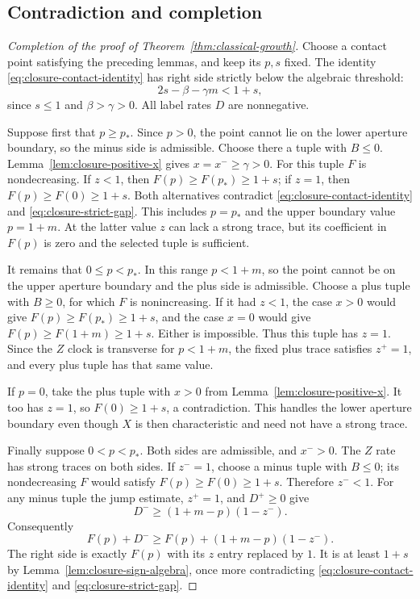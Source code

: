 \subsection{Contradiction and completion}

\begin{proof}[Completion of the proof of Theorem~\ref{thm:classical-growth}]
Choose a contact point satisfying the preceding lemmas, and keep its
$p,s$ fixed.  The identity \eqref{eq:closure-contact-identity} has
right side strictly below the algebraic threshold:
\begin{equation}
 2s-\beta-\gamma m<1+s,
 \label{eq:closure-strict-gap}
\end{equation}
since $s\le1$ and $\beta>\gamma>0$.  All label rates $D$ are
nonnegative.

Suppose first that $p\ge p_*$.  Since $p>0$, the point cannot lie
on the lower aperture boundary, so the minus side is admissible.
Choose there a tuple with $B\le0$.  Lemma~\ref{lem:closure-positive-x}
gives $x=x^-\ge\gamma>0$.  For this tuple $F$ is nondecreasing.
If $z<1$, then $F(p)\ge F(p_*)\ge1+s$; if $z=1$, then
$F(p)\ge F(0)\ge1+s$.  Both alternatives contradict
\eqref{eq:closure-contact-identity} and \eqref{eq:closure-strict-gap}.
This includes $p=p_*$ and the upper boundary value $p=1+m$.
At the latter value $z$ can lack a strong trace, but its coefficient
in $F(p)$ is zero and the selected tuple is sufficient.

It remains that $0\le p<p_*$.  In this range $p<1+m$, so the
point cannot be on the upper aperture boundary and the plus side is
admissible.  Choose a plus tuple with $B\ge0$, for which $F$ is
nonincreasing.  If it had $z<1$, the case $x>0$ would give
$F(p)\ge F(p_*)\ge1+s$, and the case $x=0$ would give
$F(p)\ge F(1+m)\ge1+s$.  Either is impossible.  Thus this tuple
has $z=1$.  Since the $Z$ clock is transverse for $p<1+m$, the
fixed plus trace satisfies $z^+=1$, and every plus tuple has that
same value.

If $p=0$, take the plus tuple with $x>0$ from
Lemma~\ref{lem:closure-positive-x}.  It too has $z=1$, so
$F(0)\ge1+s$, a contradiction.  This handles the lower aperture
boundary even though $X$ is then characteristic and need not have a
strong trace.

Finally suppose $0<p<p_*$.  Both sides are admissible, and
$x^->0$.  The $Z$ rate has strong traces on both sides.  If
$z^-=1$, choose a minus tuple with $B\le0$; its nondecreasing $F$
would satisfy $F(p)\ge F(0)\ge1+s$.  Therefore $z^-<1$.
For any minus tuple the jump estimate, $z^+=1$, and $D^+\ge0$ give
\[
 D^-\ge(1+m-p)(1-z^-).
\]
Consequently
\[
 F(p)+D^-\ge F(p)+(1+m-p)(1-z^-).
\]
The right side is exactly $F(p)$ with its $z$ entry replaced by $1$.
It is at least $1+s$ by Lemma~\ref{lem:closure-sign-algebra}, once
more contradicting \eqref{eq:closure-contact-identity} and
\eqref{eq:closure-strict-gap}.


\end{proof}
